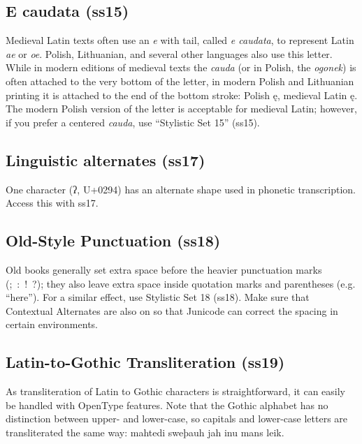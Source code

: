 \documentclass[12pt,a4paper,openany]{book}
\begin{document}
\subsection*{E caudata (ss15)}

Medieval Latin texts often use an {\itshape e} with tail, called
{\itshape e caudata}, to represent Latin {\itshape ae} or {\itshape
  oe}. Polish, Lithuanian, and several other languages also use this
letter. While in modern editions of medieval texts the {\itshape
  cauda} (or in Polish, the {\itshape ogonek}) is often attached to
the very bottom of the letter, in modern Polish and Lithuanian
printing it is attached to the end of the bottom stroke: Polish ę,
medieval Latin {ę}. The modern
Polish version of the letter is acceptable for medieval Latin;
however, if you prefer a centered {\itshape cauda}, use
“Stylistic Set 15” (ss15).

\subsection*{Linguistic alternates (ss17)}

One character (ʔ, U+0294) has an alternate shape used in phonetic
transcription. Access this with ss17.

\subsection*{Old-Style Punctuation (ss18)}

{Old books generally set
extra space before the heavier punctuation marks (; : ! ?);
they also leave extra space inside quotation marks and
parentheses (e.g. “here”). For a similar effect, use Stylistic Set 18 (ss18). Make sure
that Contextual Alternates are also on so that Junicode can correct
the spacing in certain environments.}

\subsection*{Latin-to-Gothic Transliteration (ss19)}

As transliteration of Latin to Gothic characters is straightforward,
it can easily be handled with OpenType features. Note that the Gothic
alphabet has no distinction between upper- and lower-case, so capitals
and lower-case letters are transliterated the same way:
{ mahtedi sweþauh jah inu mans leik}.
\end{document}

